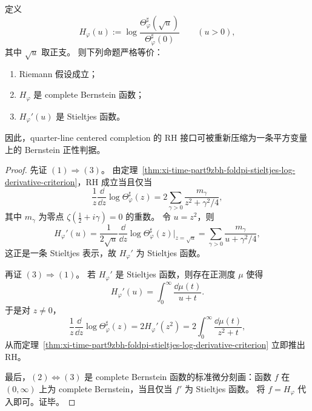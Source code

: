 \begin{theorem}\label{thm:xi-time-part9zbha-centered-completion-complete-bernstein-rh}
定义
\[
H_\varphi(u)
:=
\log\frac{\Theta_\varphi^\sharp(\sqrt u)}{\Theta_\varphi^\sharp(0)}
\qquad (u>0),
\]
其中 \(\sqrt u\) 取正支。
则下列命题严格等价：
\begin{enumerate}
  \item Riemann 假设成立；
  \item \(H_\varphi\) 是 complete Bernstein 函数；
  \item \(H_\varphi'(u)\) 是 Stieltjes 函数。
\end{enumerate}
因此，quarter-line centered completion 的 RH 接口可被重新压缩为一条平方变量上的 Bernstein 正性判据。
\end{theorem}
\begin{proof}
先证 \((1)\Rightarrow(3)\)。
由定理~\ref{thm:xi-time-part9zbh-foldpi-stieltjes-log-derivative-criterion}，RH 成立当且仅当
\[
\frac1z\frac{\dd}{\dd z}\log \Theta_\varphi^\sharp(z)
=
2\sum_{\gamma>0}\frac{m_\gamma}{z^2+\gamma^2/4},
\]
其中 \(m_\gamma\) 为零点 \(\zeta(\frac12+i\gamma)=0\) 的重数。
令 \(u=z^2\)，则
\[
H_\varphi'(u)
=
\frac{1}{2\sqrt u}\frac{\dd}{\dd z}\log \Theta_\varphi^\sharp(z)\Big|_{z=\sqrt u}
=
\sum_{\gamma>0}\frac{m_\gamma}{u+\gamma^2/4},
\]
这正是一条 Stieltjes 表示，故 \(H_\varphi'\) 为 Stieltjes 函数。

再证 \((3)\Rightarrow(1)\)。
若 \(H_\varphi'\) 是 Stieltjes 函数，则存在正测度 \(\mu\) 使得
\[
H_\varphi'(u)=\int_0^\infty \frac{\dd\mu(t)}{u+t}.
\]
于是对 \(z\neq 0\)，
\[
\frac1z\frac{\dd}{\dd z}\log \Theta_\varphi^\sharp(z)
=
2H_\varphi'(z^2)
=
2\int_0^\infty \frac{\dd\mu(t)}{z^2+t},
\]
从而定理~\ref{thm:xi-time-part9zbh-foldpi-stieltjes-log-derivative-criterion} 立即推出 RH。

最后，\((2)\Leftrightarrow(3)\) 是 complete Bernstein 函数的标准微分刻画：函数 \(f\) 在 \((0,\infty)\) 上为 complete Bernstein，当且仅当 \(f'\) 为 Stieltjes 函数。
将 \(f=H_\varphi\) 代入即可。证毕。
\end{proof}

